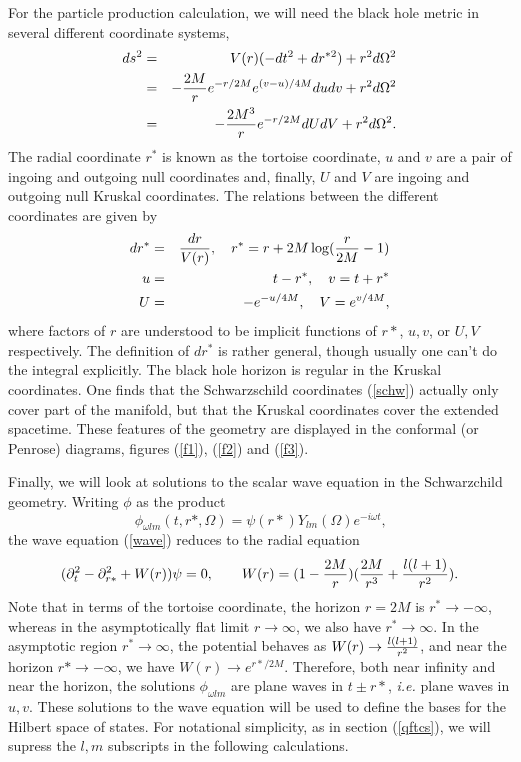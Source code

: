 \documentclass[12pt]{article}
\newcommand{\be}{\begin{equation}}
\newcommand{\ee}{\end{equation}}
\def\bena{\begin{eqnarray}}
\def\eena{\end{eqnarray}}
\begin{document}
For the particle production calculation, we will need the black hole metric
in several
different coordinate systems,
%
\bena\label{other} ds^2 &= &V(r)( -dt^2 + dr^{*2} ) + r^2 d\Omega ^2 \\
&=& -{2M\over r} e^{-r/2M} e^{(v-u)/4M} dudv    +r^2 d\Omega ^2 \\
& =& -{2M^3 \over r} e^{-r/2M}dU dV  +r^2 d\Omega ^2.\eena
%
The radial coordinate $r^*$ is known as the tortoise coordinate, $u$ and
$v$ are a
pair of ingoing and outgoing null coordinates and, finally, $U$ and $V$ are
ingoing and
outgoing null Kruskal coordinates.  The relations between the different
coordinates are
given by
%
\bena\label{coordtrans}
 dr^* &=& {dr\over V(r) },\quad r^*=r +2M \log ({r\over 2M}-1) \\
u &= &t-r^* ,\quad v=t+r^* \\
U &= &-e^{-u/4M} ,\quad  V=e^{v/4M} ,\eena
%
where factors of $r$ are understood to be implicit functions of $r*$,
$u,v$, or $U,V$ respectively. The definition of $dr^*$ is rather general,
though usually
one can't do the integral explicitly.
The black hole horizon is regular in the  Kruskal coordinates.
One finds that the Schwarzschild  coordinates (\ref{schw}) actually only
cover part of the
manifold, but that the Kruskal coordinates cover the extended  spacetime.
These features of the geometry are displayed in the conformal (or Penrose)
diagrams, figures (\ref{f1}), (\ref{f2}) and (\ref{f3}).

Finally, we will look at solutions to the scalar wave equation in the
Schwarzchild geometry.  Writing $\phi$ as the product
%
\be\label{separate}\,\phi _{\omega lm} (t,r*,\Omega )=\psi (r*) Y_{lm}(\Omega)
e^{-i\omega t},\ee
%
the wave equation (\ref{wave})  reduces to the radial equation
%
\be\label{waveschw} (\partial ^2 _t  -\partial ^2 _{r*} +W(r) )\psi =0,
\qquad W(r) =(1- {2M\over r}) ({2M\over r^3 } +{l(l+1)\over r^2} ).\ee
%
Note that in terms of the tortoise coordinate, the horizon $r=2M$ is
$r^*\rightarrow
-\infty$, whereas in the asymptotically flat limit $r\rightarrow\infty$, we
also have
$r^*\rightarrow\infty$.
In the asymptotic region $r^*\rightarrow\infty$, the potential behaves as
$W(r)\rightarrow
{l(l+1)\over r^2}$, and near the horizon $r*\rightarrow -\infty$, we have
$W(r)\rightarrow e^{r*/2M}$.  Therefore, both near infinity and near the
horizon, the
solutions $\phi _{\omega lm}$ are plane waves in $t\pm r*$, {\it i.e.}
plane waves in $u,v$.
These solutions to the wave equation will be used to define the bases for
the Hilbert
space of states. For notational simplicity, as in section (\ref{qftcs}), we will
supress the $l,m$
subscripts in the following calculations.
\end{document}
